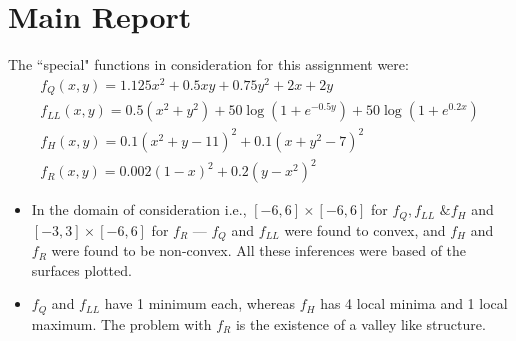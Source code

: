 \documentclass{article}
\begin{document}
\section*{Main Report}
\begin{flushleft}
The ``special" functions in consideration for this assignment were:
\begin{gather*}
f_{Q}(x, y) = 1.125x^2 + 0.5xy + 0.75y^2 + 2x + 2y \\
f_{LL}(x, y) = 0.5(x^2 + y^2) + 50\log\left(1 + e^{-0.5y}\right) + 50\log\left(1 + e^{0.2x}\right) \\
f_{H}(x, y) = 0.1(x^2 + y - 11)^2 + 0.1(x + y^2 - 7)^2 \\
f_{R}(x, y) = 0.002(1 - x)^2 + 0.2(y - x^2)^2
\end{gather*}

\begin{itemize}
\item In the domain of consideration i.e., \([-6, 6]\times[-6, 6]\) for \(f_{Q}, f_{LL} \text{ \& } f_{H}\) and \([-3, 3] \times [-6, 6]\) for \(f_{R}\) --- \(f_{Q}\) and \(f_{LL}\) were found to convex, and \(f_{H}\) and \(f_{R}\) were found to be non-convex. All these inferences were based of the surfaces plotted.
\item \(f_{Q}\) and \(f_{LL}\) have 1 minimum each, whereas \(f_{H}\) has 4 local minima and 1 local maximum. The problem with \(f_{R}\) is the existence of a valley like structure.
\end{itemize}


\end{flushleft}
\end{document}
